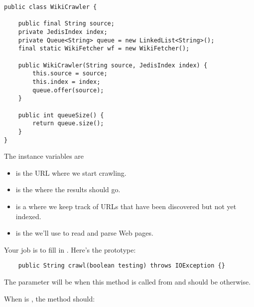 \documentclass[12pt]{book}
\theoremstyle{exercise}
\begin{document}
\begin{verbatim}
public class WikiCrawler {

    public final String source;
    private JedisIndex index;
    private Queue<String> queue = new LinkedList<String>();
    final static WikiFetcher wf = new WikiFetcher();

    public WikiCrawler(String source, JedisIndex index) {
        this.source = source;
        this.index = index;
        queue.offer(source);
    }

    public int queueSize() {
        return queue.size();
    }
}
\end{verbatim}

The instance variables are

\begin{itemize}

\item
   is the URL where we start crawling.

\item
   is the  where the results should go.

\item
   is a  where we keep track of URLs
  that have been discovered but not yet indexed.

\item
   is the  we'll use to read and parse
  Web pages.

\end{itemize}

Your job is to fill in . Here's the prototype:


\begin{verbatim}
    public String crawl(boolean testing) throws IOException {}
\end{verbatim}

The parameter  will be  when this method is
called from  and should be 
otherwise.

When  is , the  method should:
\end{document}
